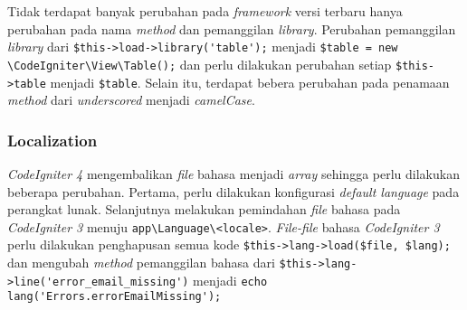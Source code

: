 Tidak terdapat banyak perubahan pada \textit{framework} versi terbaru hanya perubahan pada nama \textit{method} dan pemanggilan \textit{library}. Perubahan pemanggilan \textit{library} dari \verb|$this->load->library('table');| menjadi \verb|$table = new \CodeIgniter\View\Table();| dan perlu dilakukan perubahan setiap \verb|$this->table| menjadi \verb|$table|. Selain itu, terdapat bebera perubahan pada penamaan \textit{method} dari \textit{underscored} menjadi \textit{camelCase}.


\subsubsection{Localization}

\textit{CodeIgniter 4} mengembalikan \textit{file} bahasa menjadi \textit{array} sehingga perlu dilakukan beberapa perubahan. Pertama, perlu dilakukan konfigurasi \textit{default language} 
pada perangkat lunak. Selanjutnya melakukan pemindahan \textit{file} bahasa pada \textit{CodeIgniter 3} menuju \verb|app\Language\<locale>|. \textit{File-file} bahasa \textit{CodeIgniter 3} perlu dilakukan penghapusan semua kode \verb|$this->lang->load($file, $lang);| dan mengubah \textit{method} pemanggilan bahasa dari \verb|$this->lang->line('error_email_missing')| menjadi \verb|echo lang('Errors.errorEmailMissing');|
 

